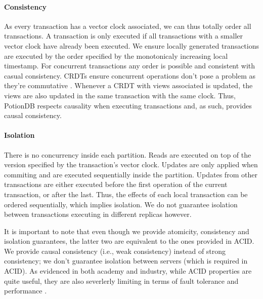 \documentclass{vldb}
\begin{document}
\paragraph{Consistency} As every transaction has a vector clock associated, we can thus totally order all transactions. 
A transaction is only executed if all transactions with a smaller vector clock have already been executed. 
We ensure locally generated transactions are executed by the order specified by the monotonicaly increasing local timestamp.
For concurrent transactions any order is possible and consistent with casual consistency.
CRDTs ensure concurrent operations don't pose a problem as they're commutative \cite{???}.
Whenever a CRDT with views associated is updated, the views are also updated in the same transaction with the same clock.
Thus, PotionDB respects causality when executing transactions and, as such, provides causal consistency.

\paragraph{Isolation} %
There is no concurrency inside each partition.
Reads are executed on top of the version specified by the transaction's vector clock. %
Updates are only applied when commiting and are executed sequentially inside the partition.
Updates from other transactions are either executed before the first operation of the current transaction, or after the last.
Thus, the effects of each local transaction can be ordered sequentially, which implies isolation.
We do not guarantee isolation between transactions executing in different replicas however.

It is important to note that even though we provide atomicity, consistency and isolation guarantees, the latter two are equivalent to the ones provided in ACID.
We provide causal consistency (i.e., weak consistency) instead of strong consistency; we don't guarantee isolation between servers (which is required in ACID).
As evidenced in both academy and industry, while ACID properties are quite useful, they are also severlerly limiting in terms of fault tolerance and performance \cite{???}.
\end{document}
